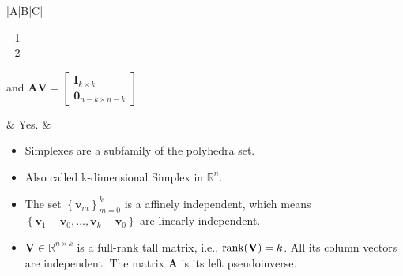\documentclass{article}
\begin{document}
\begin{table}[ht!]
\begin{tabularx}{\textwidth}{|A|B|C|}
\begin{itemize}[leftmargin=*]
\begin{bmatrix}
        _1 \\ _2
    \end{bmatrix}\) and \(\mathbf{AV} = \begin{bmatrix}
        \mathbf{I}_{k\times k}\\
        \mathbf{0}_{n-k \times n-k}
    \end{bmatrix}\)
\end{itemize} & Yes. & \vspace{-3.5ex}
\begin{itemize}[leftmargin=*]
    \item Simplexes are a subfamily of the polyhedra set.
    \item Also called k-dimensional Simplex in \(\mathbb{R}^{n}\).
    \item The set \(\left\{ \mathbf{v}_m \right\}_{m=0}^{k}\) is a affinely independent, which means \(\left\{ \mathbf{v}_1-\mathbf{v}_0, \dots, \mathbf{v}_k-\mathbf{v}_0 \right\}\) are linearly independent.
    \item \(\mathbf{V} \in \mathbb{R}^{n\times k}\) is a full-rank tall matrix, i.e., \(\textnormal{rank}(\mathbf{V}) = k\). All its column vectors are independent. The matrix \(\mathbf{A}\) is its left pseudoinverse.
\end{itemize}\\
\hline
\end{tabularx}

\end{table}
\end{document}
